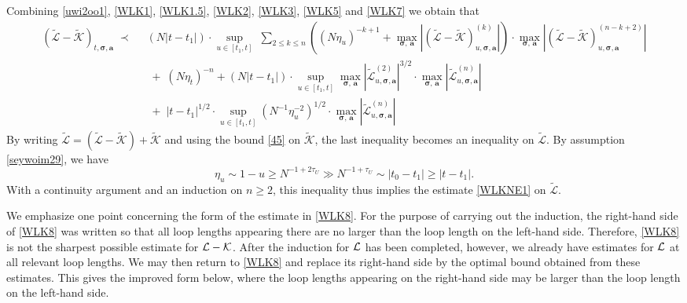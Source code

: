 \documentclass[10pt,reqno]{article}
\theoremstyle{plain} %
\theoremstyle{remark}
\numberwithin{equation}{section}
\begin{document}
Combining \eqref{uwi2oo1}, \eqref{WLK1}, \eqref{WLK1.5}, \eqref{WLK2}, \eqref{WLK3}, \eqref{WLK5} and \eqref{WLK7} we obtain that 
     \begin{align} \nonumber
    (\mathcal{\widetilde{L}} - \mathcal{\widetilde{K}})_{t, \boldsymbol{\sigma}, \textbf{a}} \;\prec \; \; &
     \left(N|t-t_1|\right)\cdot \sup_{u\in [t_1,t]}\;\sum_{2\le k\le n} \left((N\eta_u)^{-k+1}+\max_{\boldsymbol{\sigma}, \,\textbf{a}}   \left|(\mathcal{\widetilde{L}}-\mathcal{\widetilde{K}})^{(k)}_{u, \boldsymbol{\sigma}, \textbf{a}}\right|\right)\cdot \max_{\boldsymbol{\sigma}, \,\textbf{a}}   \left|(\mathcal{\widetilde{L}}-\mathcal{\widetilde{K}})^{(n-k+2)}_{u, \boldsymbol{\sigma}, \textbf{a}}\right| 
    \\\label{WLK8}
    &\;+\;(N\eta_t)^{-n}
    +   \left(N|t-t_1|\right)\cdot \sup_{u\in [t_1,t]} \max_{\boldsymbol{\sigma}, \,\textbf{a}}   \left| \mathcal{\widetilde{L}} ^{(2)}_{u, \boldsymbol{\sigma}, \textbf{a}}\right|^{3/2}\cdot \max_{\boldsymbol{\sigma}, \,\textbf{a}}   \left|\mathcal{\widetilde{L}} ^{(n )} _{u, \boldsymbol{\sigma}, \textbf{a}}\right|
    \\\nonumber
    &\;+\; |t-t_1|^{1/2}\cdot \sup_{u\in [t_1,t]}\left(  N^{-1}\eta_u^{-2}\right)^{1/2} \cdot \max_{\boldsymbol{\sigma}, \,\textbf{a}}   \left|\mathcal{\widetilde{L}} ^{( n )} _{u, \boldsymbol{\sigma}, \textbf{a}}\right| 
    \end{align} 
By writing $\mathcal{\widetilde{L}} 
= (\mathcal{\widetilde{L}} - \mathcal{\widetilde{K}}) + \mathcal{\widetilde{K}} $ and using the bound \eqref{45} on $\mathcal{\widetilde{K}}$, 
the last inequality becomes an inequality on $\mathcal{\widetilde{L}} $.     
By assumption  \eqref{seywoim29}, we have 
    $$
    \eta_u\sim 1-u \ge N^{-1+2\tau_U}\gg N^{-1+ \tau_U}\sim |t_0-t_1|\ge |t-t_1| .
    $$
With  a continuity argument and an  induction on $n\ge 2$, this inequality thus implies the estimate  \eqref{WLKNE1} on $\mathcal{\widetilde{L}}$. 

We emphasize one point concerning the form of the estimate in \eqref{WLK8}.
For the purpose of carrying out the induction, the right-hand side of
\eqref{WLK8} was written so that all loop lengths appearing there are no
larger than the loop length on the left-hand side. Therefore, \eqref{WLK8}
is not the sharpest possible estimate for \({\cal L}-{\cal K}\). After the
induction for \({\cal L}\) has been completed, however, we already have
estimates for \({\cal L}\) at all relevant loop lengths. We may then return
to \eqref{WLK8} and replace its right-hand side by the optimal bound obtained
from these estimates. This gives the improved form below, where the loop
lengths appearing on the right-hand side may be larger than the loop length
on the left-hand side.
\end{document}
